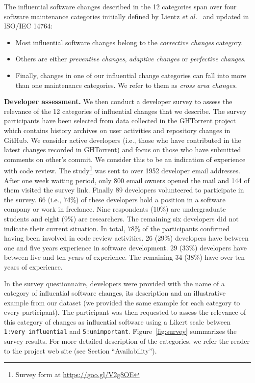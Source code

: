 The influential software changes described in the 12 categories span over
four software maintenance categories initially defined by Lientz {\em et
al.}~\cite{Lientz:1978:CAS:359511.359522} and updated in ISO/IEC 14764:
\begin{itemize}
	\item  Most influential software changes belong to the {\em corrective changes} category.
	\item  Others are either {\em preventive changes}, {\em adaptive changes} or {\em perfective changes}.
	\item  Finally, changes in one of our influential change categories can fall into more than one maintenance categories. We refer to them as {\em cross area changes}.
\end{itemize}
  


\textbf{Developer assessment.}
We then conduct a developer survey to assess the relevance of the 12 categories of influential changes that we describe. 
The survey participants have been selected from data collected in the GHTorrent project~\cite{Gousi13} which contains history
archives on user activities and repository changes in GitHub. We consider active developers (i.e., those who have contributed in the latest changes recorded in GHTorrent) and focus on those who have submitted comments on other's commit. We consider this to be an indication of experience with code review. The study\footnote{Survey form at \url{https://goo.gl/V2g8OE}} was sent to over 1952 developer email addresses. After one week waiting period, only 800 email owners opened the mail and 144 of them visited the survey link. Finally 89 developers volunteered to participate in the survey. 66 (i.e., 74\%) of these developers hold a position in a software company or work in freelance. Nine respondents (10\%) are undergraduate students and eight (9\%) are researchers. The remaining six developers did not indicate their current situation. In total, 78\% of the participants confirmed having been involved in code review activities. 26 (29\%) developers have between one and five years experience in software development. 29 (33\%) developers have between five and ten years of experience. The remaining 34 (38\%) have over ten years of experience. 

In the survey questionnaire, developers were provided with the name of a category of influential software changes, its description and an illustrative example from our dataset (we provided the same example for each category to every participant). The participant was then requested to assess the relevance of this category of changes as influential software using a Likert scale between {\tt 1:very influential} and {\tt 5:unimportant}. Figure~\ref{fig:survey} summarizes the survey results. For more detailed description of the categories, we refer the reader to the project web site (see Section ``Availability'').

